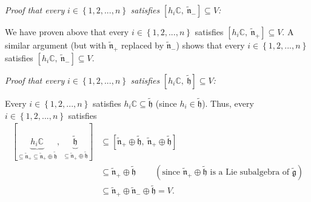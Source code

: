 \documentclass[etingof-lie.tex]{subfiles}
\begin{document}
\textit{Proof that every }$i\in\left\{  1,2,...,n\right\}  $\textit{ satisfies
}$\left[  h_{i}\mathbb{C},\ \widetilde{\mathfrak{n}}_{-}\right]  \subseteq
V$\textit{:}

We have proven above that every $i\in\left\{  1,2,...,n\right\}  $ satisfies
$\left[  h_{i}\mathbb{C},\ \widetilde{\mathfrak{n}}_{+}\right]  \subseteq V$.
A similar argument (but with $\widetilde{\mathfrak{n}}_{+}$ replaced by
$\widetilde{\mathfrak{n}}_{-}$) shows that every $i\in\left\{
1,2,...,n\right\}  $ satisfies $\left[  h_{i}\mathbb{C}%
,\ \widetilde{\mathfrak{n}}_{-}\right]  \subseteq V$.

\textit{Proof that every }$i\in\left\{  1,2,...,n\right\}  $\textit{ satisfies
}$\left[  h_{i}\mathbb{C},\ \widetilde{\mathfrak{h}}\right]  \subseteq
V$\textit{:}

Every $i\in\left\{  1,2,...,n\right\}  $ satisfies $h_{i}\mathbb{C}%
\subseteq\widetilde{\mathfrak{h}}$ (since $h_{i}\in\widetilde{\mathfrak{h}}$).
Thus, every $i\in\left\{  1,2,...,n\right\}  $ satisfies%
\begin{align*}
\left[  \underbrace{h_{i}\mathbb{C}}_{\subseteq\widetilde{\mathfrak{n}}%
_{+}\subseteq\widetilde{\mathfrak{n}}_{+}\oplus\widetilde{\mathfrak{h}}%
},\ \underbrace{\widetilde{\mathfrak{h}}}_{\subseteq\widetilde{\mathfrak{n}%
}_{+}\oplus\widetilde{\mathfrak{h}}}\right]   &  \subseteq\left[
\widetilde{\mathfrak{n}}_{+}\oplus\widetilde{\mathfrak{h}}%
,\ \widetilde{\mathfrak{n}}_{+}\oplus\widetilde{\mathfrak{h}}\right] \\
&  \subseteq\widetilde{\mathfrak{n}}_{+}\oplus\widetilde{\mathfrak{h}%
}\ \ \ \ \ \ \ \ \ \ \left(  \text{since }\widetilde{\mathfrak{n}}_{+}%
\oplus\widetilde{\mathfrak{h}}\text{ is a Lie subalgebra of }%
\widetilde{\mathfrak{g}}\right) \\
&  \subseteq\widetilde{\mathfrak{n}}_{+}\oplus\widetilde{\mathfrak{n}}%
_{-}\oplus\widetilde{\mathfrak{h}}=V.
\end{align*}
\end{document}
